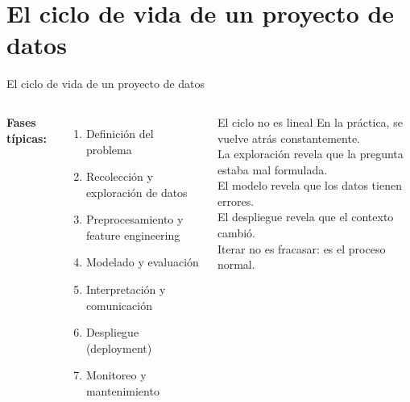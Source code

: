 \documentclass[aspectratio=169]{beamer}
\begin{document}
\section{El ciclo de vida de un proyecto de datos}

\begin{frame}{El ciclo de vida de un proyecto de datos}
  \begin{columns}
      \textbf{Fases típicas:}
      \begin{enumerate}
        \item Definición del problema
        \item Recolección y exploración de datos
        \item Preprocesamiento y feature engineering
        \item Modelado y evaluación
        \item Interpretación y comunicación
        \item Despliegue (deployment)
        \item Monitoreo y mantenimiento
      \end{enumerate}
      \begin{exampleblock}{El ciclo no es lineal}
        En la práctica, se vuelve atrás constantemente.\\
        La exploración revela que la pregunta estaba mal formulada.\\
        El modelo revela que los datos tienen errores.\\
        El despliegue revela que el contexto cambió.\\
        \bigskip
        Iterar no es fracasar: es el proceso normal.
      \end{exampleblock}
  \end{columns}
\end{frame}
\end{document}
